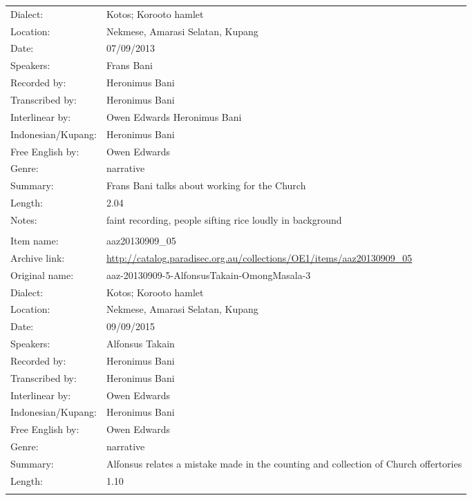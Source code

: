 \begin{longtable}{lL{.67\textwidth}}
Dialect:				& Kotos; Koro{\Q}oto hamlet \\
Location:				& Nekmese{\Q}, Amarasi Selatan, Kupang \\
Date:				& 07/09/2013\\
Speakers:				& Frans Bani\\
Recorded by:			& Heronimus Bani\\
Transcribed by:		& Heronimus Bani\\
Interlinear by:		& Owen Edwards Heronimus Bani\\
Indonesian/Kupang:		& Heronimus Bani\\
Free English by:		& Owen Edwards\\
Genre:				& narrative\\
Summary:				& Frans Bani talks about working for the Church\\
Length:				& 2.04\\
Notes:				& faint recording, people sifting rice loudly in background\\ \lspbottomrule
{}			& \\
Item name:			& aaz20130909{\_}05\\
Archive link:			& \url{http://catalog.paradisec.org.au/collections/OE1/items/aaz20130909_05}\\
Original name:			& aaz-20130909-5-AlfonsusTakain-OmongMasala-3\\
Dialect:				& Kotos; Koro{\Q}oto hamlet \\
Location:				& Nekmese{\Q}, Amarasi Selatan, Kupang \\
Date:				& 09/09/2015\\
Speakers:				& Alfonsus Takain\\
Recorded by:			& Heronimus Bani\\
Transcribed by:		& Heronimus Bani\\
Interlinear by:		& Owen Edwards \\
Indonesian/Kupang:		& Heronimus Bani\\
Free English by:		& Owen Edwards\\
Genre:				& narrative\\
Summary:				& Alfonsus relates a mistake made in the counting and collection of Church offertories\\
Length:				& 1.10\\ \lspbottomrule
{}			& \\

\end{longtable}

